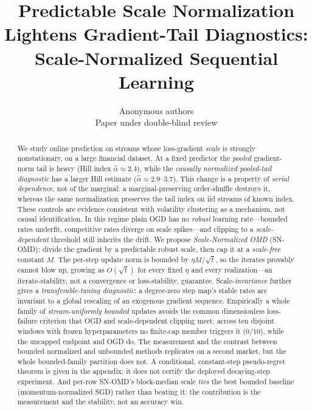 \documentclass{article}
\title{Predictable Scale Normalization Lightens Gradient-Tail Diagnostics:\\ Scale-Normalized Sequential Learning}
\author{Anonymous authors\\Paper under double-blind review}
\begin{document}
\maketitle

\begin{abstract}
We study online prediction on streams whose loss-gradient \emph{scale} is strongly
nonstationary, on a large financial dataset. At a fixed predictor the \emph{pooled}
gradient-norm tail is heavy (Hill index $\hat\alpha\approx2.4$), while the
\emph{causally normalized pooled-tail diagnostic} has a larger Hill estimate
($\hat\alpha\approx2.9$--$3.7$). This change is a
property of \emph{serial dependence}, not of the marginal: a marginal-preserving order-shuffle
destroys it, whereas the same normalization preserves the tail index on iid streams of known index.
These controls are evidence consistent with volatility clustering as a mechanism, not causal
identification. In this regime plain OGD has no \emph{robust} learning rate---bounded rates
underfit, competitive rates diverge on scale spikes---and clipping to a \emph{scale-dependent}
threshold still inherits the drift. We propose \emph{Scale-Normalized OMD} (SN-OMD): divide the
gradient by a predictable robust scale, then cap it at a \emph{scale-free} constant $M$. The
per-step update norm is bounded by $\eta M/\sqrt t$, so the iterates provably cannot blow up,
growing as $O(\sqrt t)$ for every fixed $\eta$ and every realization---an iterate-stability,
not a convergence or loss-stability, guarantee. Scale-\emph{invariance} further gives a
\emph{transferable-tuning diagnostic}: a degree-zero step map's stable rates are invariant to
a global rescaling of an exogenous gradient sequence. Empirically a whole family of
\emph{stream-uniformly bounded} updates avoids the common dimensionless loss-failure criterion that OGD and
scale-dependent clipping meet: across ten disjoint windows with frozen hyperparameters no
finite-cap member triggers it ($0/10$), while the uncapped endpoint and OGD do. The measurement and the
contrast between bounded normalized and unbounded methods replicates on a second market, but the whole bounded-family
partition does not. A conditional, constant-step pseudo-regret theorem is
given in the appendix; it does not certify the deployed decaying-step experiment.
And per-row SN-OMD's block-median scale \emph{ties} the best bounded baseline
(momentum-normalized SGD) rather than beating it: the contribution is the measurement and the
stability, not an accuracy win.
\end{abstract}
\end{document}
